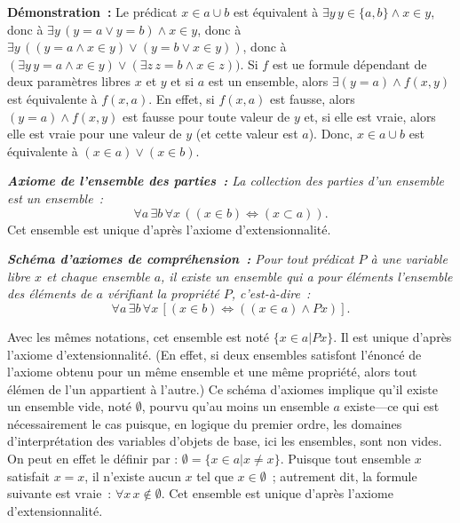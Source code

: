 \medskip

\noindent\textbf{Démonstration :} 
    Le prédicat $x \in a \cup b$ est équivalent à $\exists y \, y \in \lbrace a, b \rbrace \wedge x \in y$, donc à $\exists y \, (y = a \vee y = b) \wedge x \in y$, donc à $\exists y \, ((y = a \wedge x \in y) \vee (y = b \vee x \in y))$, donc à $(\exists y \, y = a \wedge x \in y) \vee (\exists z \, z = b \wedge x \in z))$.
    Si $f$ est ue formule dépendant de deux paramètres libres $x$ et $y$ et si $a$ est un ensemble, alors $\exists (y = a) \wedge f(x,y)$ est équivalente à $f(x,a)$.
    En effet, si $f(x,a)$ est fausse, alors $(y = a) \wedge f(x,y)$ est fausse pour toute valeur de $y$ et, si elle est vraie, alors elle est vraie pour une valeur de $y$ (et cette valeur est $a$). 
    Donc, $x \in a \cup b$ est équivalente à $(x \in a) \vee (x \in b)$.

    \done

\medskip

\noindent\textit{\textbf{Axiome de l'ensemble des parties :} La collection des parties d'un ensemble est un ensemble :} 
\begin{equation*}
    \forall a \, \exists b \, \forall x \, (
        (x \in b) \Leftrightarrow (x \subset a)
    ).
\end{equation*}
Cet ensemble est unique d'après l'axiome d'extensionnalité.

\medskip

\noindent\textit{\textbf{Schéma d'axiomes de compréhension :} 
Pour tout prédicat $P$ à une variable libre $x$ et chaque ensemble $a$, il existe un ensemble qui a pour éléments l'ensemble des éléments de $a$ vérifiant la propriété $P$, c'est-à-dire :}
\begin{equation*}
\forall a \, \exists b \, \forall x \, [ (x \in b) \Leftrightarrow ((x \in a) \wedge P x)]. 
\end{equation*}

Avec les mêmes notations, cet ensemble est noté $\lbrace x \in a \vert P x \rbrace$. 
Il est unique d'après l'axiome d'extensionnalité. 
(En effet, si deux ensembles satisfont l'énoncé de l'axiome obtenu pour un même ensemble et une même propriété, alors tout élémen de l'un appartient à l'autre.)
Ce schéma d'axiomes implique qu'il existe un ensemble vide, noté $\emptyset$, pourvu qu'au moins un ensemble $a$ existe—ce qui est nécessairement le cas puisque, en logique du premier ordre, les domaines d'interprétation des variables d'objets de base, ici les ensembles, sont non vides. 
On peut en effet le définir par : $\emptyset = \lbrace x \in a \vert x \neq x \rbrace$. 
Puisque tout ensemble $x$ satisfait $x = x$, il n'existe aucun $x$ tel que $x \in \emptyset$ ; autrement dit, la formule suivante est vraie : $\forall x \, x \notin \emptyset$. 
Cet ensemble est unique d'après l'axiome d'extensionnalité.

